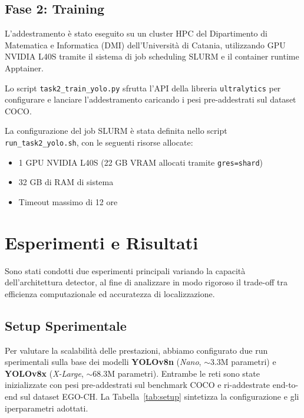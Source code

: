 \documentclass[a4paper,12pt]{report}
\begin{document}
\FloatBarrier

\subsection{Fase 2: Training}

L'addestramento è stato eseguito su un cluster HPC del Dipartimento di Matematica e Informatica (DMI) dell'Università di Catania, utilizzando GPU NVIDIA L40S tramite il sistema di job scheduling SLURM e il container runtime Apptainer.

Lo script \texttt{task2\_train\_yolo.py} sfrutta l'API della libreria \texttt{ultralytics} per configurare e lanciare l'addestramento caricando i pesi pre-addestrati sul dataset COCO.

La configurazione del job SLURM è stata definita nello script \texttt{run\_task2\_yolo.sh}, con le seguenti risorse allocate:
\begin{itemize}
    \item 1 GPU NVIDIA L40S (22 GB VRAM allocati tramite \texttt{gres=shard})
    \item 32 GB di RAM di sistema
    \item Timeout massimo di 12 ore
\end{itemize}

\section{Esperimenti e Risultati}

Sono stati condotti due esperimenti principali variando la capacità dell'architettura detector, al fine di analizzare in modo rigoroso il trade-off tra efficienza computazionale ed accuratezza di localizzazione.

\subsection{Setup Sperimentale}

Per valutare la scalabilità delle prestazioni, abbiamo configurato due run sperimentali sulla base dei modelli \textbf{YOLOv8n} (\emph{Nano}, $\sim$3.3M parametri) e \textbf{YOLOv8x} (\emph{X-Large}, $\sim$68.3M parametri). Entrambe le reti sono state inizializzate con pesi pre-addestrati sul benchmark COCO e ri-addestrate end-to-end sul dataset EGO-CH. La Tabella~\ref{tab:setup} sintetizza la configurazione e gli iperparametri adottati.
\end{document}
